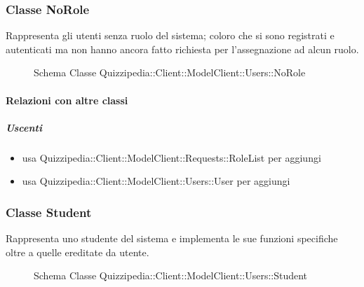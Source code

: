 \subsubsection{Classe NoRole}
Rappresenta gli utenti senza ruolo del sistema; coloro che si sono registrati e autenticati ma non hanno ancora fatto richiesta per l'assegnazione ad alcun ruolo.
\begin{figure}[H]
\centering
\noindent{}
\caption[Schema Classe NoRole]{Schema Classe Quizzipedia::Client::ModelClient::Users::NoRole}
\end{figure}
\paragraph{Relazioni con altre classi}
\subparagraph{Uscenti}
\begin{itemize}
\item usa Quizzipedia::Client::ModelClient::Requests::RoleList per aggiungi
\item usa Quizzipedia::Client::ModelClient::Users::User per aggiungi
\end{itemize}
\subsubsection{Classe Student}
Rappresenta uno studente del sistema e implementa le sue funzioni specifiche oltre a quelle ereditate da utente.
\begin{figure}[H]
\centering
\noindent{}
\caption[Schema Classe Student]{Schema Classe Quizzipedia::Client::ModelClient::Users::Student}
\end{figure}
